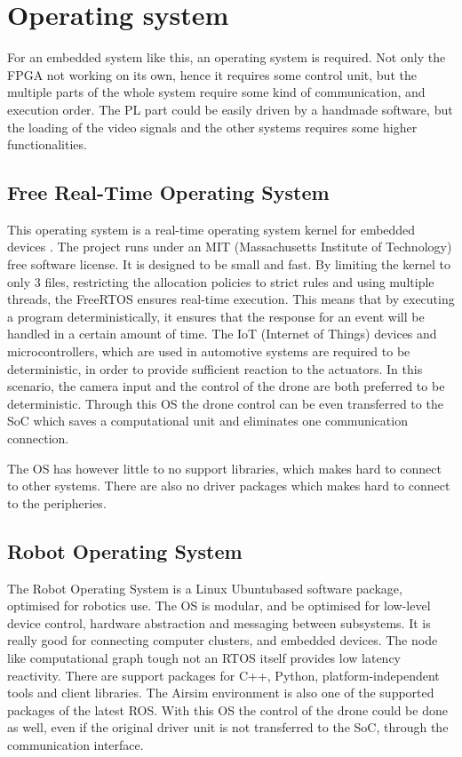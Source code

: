 \section{Operating system} %
For an embedded system like this, an operating system is required.
Not only the FPGA not working on its own, hence it requires some control unit, but the multiple parts of the whole system require some kind of communication, and execution order.
The PL part could be easily driven by a handmade software, but the loading of the video signals and the other systems requires some higher functionalities.

\subsection{Free Real-Time Operating System} %
This operating system is a real-time operating system kernel for embedded devices \cite{FreeROTS}.
The project runs under an MIT (Massachusetts Institute of Technology) free software license.
It is designed to be small and fast.
By limiting the kernel to only 3 files, restricting the allocation policies to strict rules and using multiple threads, the FreeRTOS ensures real-time execution.
This means that by executing a program deterministically, it ensures that the response for an event will be handled in a certain amount of time.
The IoT (Internet of Things) devices and microcontrollers, which are used in automotive systems are required to be deterministic, in order to provide sufficient reaction to the actuators.
In this scenario, the camera input and the control of the drone are both preferred to be deterministic.
Through this OS the drone control can be even transferred to the SoC which saves a computational unit and eliminates one communication connection.

The OS has however little to no support libraries, which makes hard to connect to other systems.
There are also no driver packages which makes hard to connect to the peripheries.

\subsection{Robot Operating System} %
The Robot Operating System \cite{ROS} is a Linux Ubuntu\texttrademark based software package, optimised for robotics use.
The OS is modular, and be optimised for low-level device control, hardware abstraction and messaging between subsystems.
It is really good for connecting computer clusters, and embedded devices.
The node like computational graph tough not an RTOS itself provides low latency reactivity.
There are support packages for C++, Python, platform-independent tools and client libraries.
The Airsim environment is also one of the supported packages of the latest ROS.
With this OS the control of the drone could be done as well, even if the original driver unit is not transferred to the SoC, through the communication interface.

